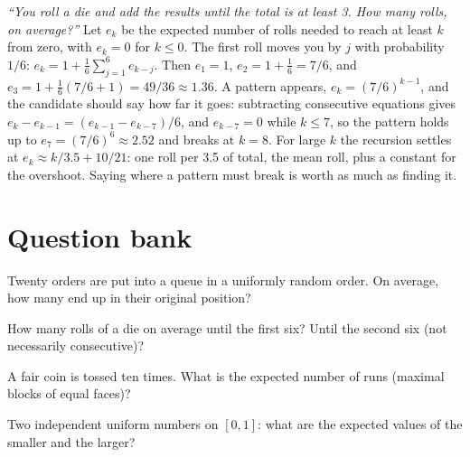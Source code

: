 \begin{example}\label{ex:iv:probability-ii:total}
\emph{``You roll a die and add the results until the total is at least 3. How many rolls, on average?''} Let $e_k$ be
the expected number of rolls needed to reach at least $k$ from zero, with $e_k = 0$ for $k \le 0$. The first roll moves
you by $j$ with probability $1/6$: $e_k = 1 + \tfrac16\sum_{j=1}^6 e_{k-j}$. Then $e_1 = 1$, $e_2 = 1 + \tfrac16 = 7/6$,
and $e_3 = 1 + \tfrac16(7/6 + 1) = 49/36 \approx 1.36$. A pattern appears, $e_k = (7/6)^{k-1}$, and the candidate
should say how far it goes: subtracting consecutive equations gives $e_k - e_{k-1} = (e_{k-1} - e_{k-7})/6$, and $e_{k-7}
= 0$ while $k \le 7$, so the pattern holds up to $e_7 = (7/6)^6 \approx 2.52$ and breaks at $k = 8$. For large $k$ the
recursion settles at $e_k \approx k/3.5 + 10/21$: one roll per 3.5 of total, the mean roll, plus a constant for the
overshoot. Saying where a pattern must break is worth as much as finding it.
\end{example}

\section{Question bank}

\begin{interviewq}\label{iq:iv:probability-ii:1}
Twenty orders are put into a queue in a uniformly random order. On average, how many end up in their original
position?
\end{interviewq}

\begin{interviewq}\label{iq:iv:probability-ii:2}
How many rolls of a die on average until the first six? Until the second six (not necessarily consecutive)?
\end{interviewq}

\begin{interviewq}\label{iq:iv:probability-ii:3}
A fair coin is tossed ten times. What is the expected number of runs (maximal blocks of equal faces)?
\end{interviewq}

\begin{interviewq}\label{iq:iv:probability-ii:4}
Two independent uniform numbers on $[0,1]$: what are the expected values of the smaller and the larger?
\end{interviewq}

